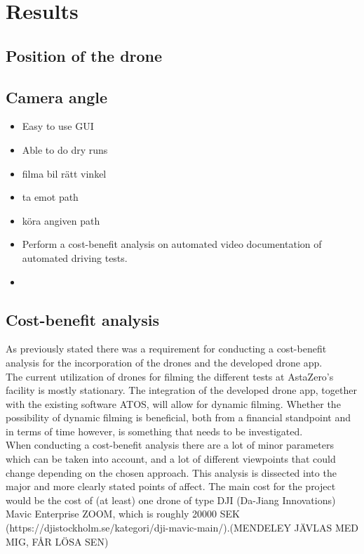 \chapter{Results}
\section{Position of the drone}

\section{Camera angle}

\begin{itemize}
    \item Easy to use GUI
    \item Able to do dry runs 
    \item filma bil rätt vinkel
    \item ta emot path
    \item köra angiven path
    \item Perform a cost-benefit analysis on automated video documentation of automated
driving tests.
\item 
\end{itemize}

\section{Cost-benefit analysis} \label{Cost-benefit}
As previously stated there was a requirement for conducting a cost-benefit analysis for the incorporation of the drones and the developed drone app. 
\\

The current utilization of drones for filming the different tests at AstaZero’s facility is mostly stationary. The integration of the developed drone app, together with the existing software ATOS, will allow for dynamic filming. Whether the possibility of dynamic filming is beneficial, both from a financial standpoint and in terms of time however, is something that needs to be investigated. 
\\

When conducting a cost-benefit analysis there are a lot of minor parameters which can be taken into account, and a lot of different viewpoints that could change depending on the chosen approach. This analysis is dissected into the major and more clearly stated points of affect. 
The main cost for the project would be the cost of (at least) one drone of type DJI (Da-Jiang Innovations) Mavic Enterprise ZOOM, which is roughly 20000 SEK (https://djistockholm.se/kategori/dji-mavic-main/).(MENDELEY JÄVLAS MED MIG, FÅR LÖSA SEN)
\\

